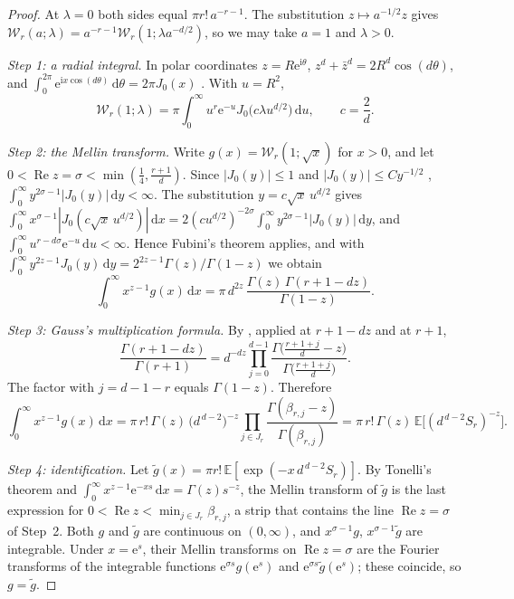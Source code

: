 \documentclass[twoside,10pt]{article}
\numberwithin{equation}{section}
\theoremstyle{slbody}
\theoremstyle{remark}
\newcommand{\dd}{\,\mathrm d}
\newcommand{\ii}{\mathrm i}
\newcommand{\e}{\mathrm e}
\newcommand{\E}{\mathbb E}
\begin{document}
\begin{proof}
At \(\lambda=0\) both sides equal \(\pi r!\,a^{-r-1}\).  The substitution
\(z\mapsto a^{-1/2}z\) gives
\(\mathcal W_r(a;\lambda)=a^{-r-1}\mathcal W_r(1;\lambda a^{-d/2})\), so
we may take \(a=1\) and \(\lambda>0\).

\emph{Step 1: a radial integral.}  In polar coordinates
\(z=R\e^{\ii\theta}\), \(z^d+\bar z^d=2R^d\cos(d\theta)\), and
\(\int_0^{2\pi}\e^{\ii x\cos(d\theta)}\dd\theta=2\pi J_0(x)\)
\cite[equation~(10.9.2)]{NISTHandbook2010}.  With \(u=R^2\),
\[
\mathcal W_r(1;\lambda)
=\pi\int_0^\infty u^r\e^{-u}J_0\bigl(c\lambda u^{d/2}\bigr)\dd u,
\qquad c=\frac2d.
\]

\emph{Step 2: the Mellin transform.}  Write
\(g(x)=\mathcal W_r(1;\sqrt x)\) for \(x>0\), and let
\(0<\operatorname{Re}z=\sigma<\min(\frac14,\frac{r+1}d)\).  Since
\(|J_0(y)|\leq1\) and \(|J_0(y)|\leq Cy^{-1/2}\)
\cite[equations~(10.14.1) and (10.17.3)]{NISTHandbook2010},
\(\int_0^\infty y^{2\sigma-1}|J_0(y)|\dd y<\infty\).  The substitution
\(y=c\sqrt x\,u^{d/2}\) gives
\(\int_0^\infty x^{\sigma-1}|J_0(c\sqrt x\,u^{d/2})|\dd x
=2(cu^{d/2})^{-2\sigma}\int_0^\infty y^{2\sigma-1}|J_0(y)|\dd y\), and
\(\int_0^\infty u^{r-d\sigma}\e^{-u}\dd u<\infty\).  Hence Fubini's
theorem applies, and with
\(\int_0^\infty y^{2z-1}J_0(y)\dd y=2^{2z-1}\Gamma(z)/\Gamma(1-z)\)
\cite[equation~(10.22.43)]{NISTHandbook2010} we obtain
\[
\int_0^\infty x^{z-1}g(x)\dd x
=\pi\,d^{2z}\,\frac{\Gamma(z)\,\Gamma(r+1-dz)}{\Gamma(1-z)} .
\]

\emph{Step 3: Gauss's multiplication formula.}  By
\cite[equation~(5.5.6)]{NISTHandbook2010}, applied at \(r+1-dz\) and at
\(r+1\),
\[
\frac{\Gamma(r+1-dz)}{\Gamma(r+1)}
=d^{-dz}\prod_{j=0}^{d-1}
\frac{\Gamma\bigl(\frac{r+1+j}{d}-z\bigr)}{\Gamma\bigl(\frac{r+1+j}{d}\bigr)}.
\]
The factor with \(j=d-1-r\) equals \(\Gamma(1-z)\).  Therefore
\[
\int_0^\infty x^{z-1}g(x)\dd x
=\pi\,r!\,\Gamma(z)\,\bigl(d^{\,d-2}\bigr)^{-z}
\prod_{j\in J_r}\frac{\Gamma(\beta_{r,j}-z)}{\Gamma(\beta_{r,j})}
=\pi\,r!\,\Gamma(z)\,\E\bigl[(d^{\,d-2}S_r)^{-z}\bigr].
\]

\emph{Step 4: identification.}  Let
\(\tilde g(x)=\pi r!\,\E[\exp(-x\,d^{\,d-2}S_r)]\).  By Tonelli's theorem
and \(\int_0^\infty x^{z-1}\e^{-xs}\dd x=\Gamma(z)s^{-z}\), the Mellin
transform of \(\tilde g\) is the last expression for
\(0<\operatorname{Re}z<\min_{j\in J_r}\beta_{r,j}\), a strip that
contains the line \(\operatorname{Re}z=\sigma\) of Step~2.  Both \(g\)
and \(\tilde g\) are continuous on \((0,\infty)\), and
\(x^{\sigma-1}g\), \(x^{\sigma-1}\tilde g\) are integrable.  Under
\(x=\e^s\), their Mellin transforms on \(\operatorname{Re}z=\sigma\) are
the Fourier transforms of the integrable functions \(\e^{\sigma s}g(\e^s)\)
and \(\e^{\sigma s}\tilde g(\e^s)\); these coincide, so \(g=\tilde g\).
\end{proof}
\end{document}
